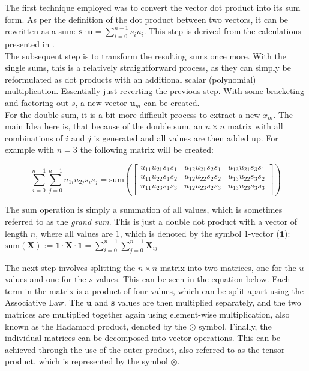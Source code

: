 The first technique employed was to convert the vector dot product into its sum form. As per the definition of the dot product between two vectors, it can be rewritten as a sum: $\textbf{s}\cdot \textbf{u} = \sum_{i=0}^{n-1}s_iu_i$. This step is derived from the calculations presented in \cite{ModHE}.\\
The subsequent step is to transform the resulting sums once more. With the single sums, this is a relatively straightforward process, as they can simply be reformulated as dot products with an additional scalar (polynomial) multiplication. Essentially just reverting the previous step. With some bracketing and factoring out $s$, a new vector $\textbf{u}_m$ can be created. \\
For the double sum, it is a bit more difficult process to extract a new $x_m$. The main Idea here is, that because of the double sum, an $n\times n$ matrix with all combinations of $i$ and $j$ is generated and all values are then added up. For example with $n=3$ the following matrix will be created:

$$
  \sum_{i=0}^{n-1}\sum_{j=0}^{n-1}u_{1i}u_{2j}s_is_j = \mathrm{sum}\left(\begin{bmatrix}
      u_{11}u_{21}s_{1}s_{1} & u_{12}u_{21}s_{2}s_{1} & u_{13}u_{21}s_{3}s_{1} \\
      u_{11}u_{22}s_{1}s_{2} & u_{12}u_{22}s_{2}s_{2} & u_{13}u_{22}s_{3}s_{2} \\
      u_{11}u_{23}s_{1}s_{3} & u_{12}u_{23}s_{2}s_{3} & u_{13}u_{23}s_{3}s_{3} \\
    \end{bmatrix}\right)
$$

The $\mathrm{sum}$ operation is simply a summation of all values, which is sometimes referred to as the \textit{grand sum}. This is just a double dot product with a vector of length $n$, where all values are $1$, which is denoted by the symbol $1$-vector ($\textbf{1}$): $\mathrm{sum}(\textbf{X}):= \textbf{1}\cdot \textbf{X} \cdot \textbf{1} = \sum_{i=0}^{n-1}\sum_{j=0}^{n-1} \textbf{X}_{ij}$

The next step involves splitting the $n \times n$ matrix into two matrices, one for the $u$ values and one for the $s$ values. This can be seen in the equation below. Each term in the matrix is a product of four values, which can be split apart using the Associative Law. The $\textbf{u}$ and $\textbf{s}$ values are then multiplied separately, and the two matrices are multiplied together again using element-wise multiplication, also known as the Hadamard product, denoted by the $\odot$ symbol. Finally, the individual matrices can be decomposed into vector operations. This can be achieved through the use of the outer product, also referred to as the tensor product, which is represented by the symbol $\otimes$.


